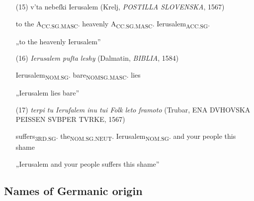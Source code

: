 \documentclass[output=paper,colorlinks,citecolor=brown,arabicfont,chinesefont]{langscibook}
\begin{document}
\begin{itemize}
    \item[(15)] v'ta nebeſki Ierusalem (Krelj, \emph{POSTILLA SLOVENSKA}, 1567) 
    
    to the A\textsubscript{CC.SG.MASC}. heavenly A\textsubscript{CC.SG.MASC}. Ierusalem\textsubscript{ACC.SG}.
    
    „to the heavenly Ierusalem”

    \item[(16)] \emph{Ierusalem puſta leshy} (Dalmatin, \emph{BIBLIA}, 1584) 
    
    Ierusalem\textsubscript{NOM.SG}. bare\textsubscript{NOMSG.MASC}. lies

    „Ierusalem lies bare”

    \item[(17)] \emph{terpi tu Ieruſalem inu tui Folk leto ſramoto} (Trubar, ENA DVHOVSKA PEISSEN SVBPER TVRKE, 1567)
    
    suffers\textsubscript{3RD.SG}. the\textsubscript{NOM.SG.NEUT}. Ierusalem\textsubscript{NOM.SG}. and your people this shame
    
    „Ierusalem and your people suffers this shame”

\end{itemize}

\subsection{Names of Germanic origin}
\end{document}
